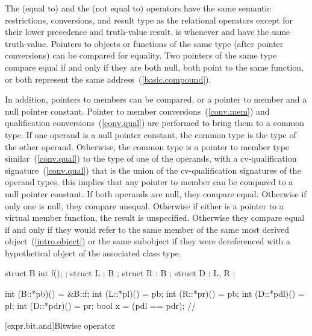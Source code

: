 \pnum
The \tcode{==} (equal to) and the \tcode{!=} (not equal to) operators
have the same semantic restrictions, conversions, and result type as the
relational operators except for their lower precedence and truth-value
result.
\enternote 
{} is  whenever  and 
have the same truth-value.
\exitnote 
{}%
%
Pointers to objects or functions of the same type (after pointer
conversions) can be compared for equality. Two pointers of the same type
compare equal if and only if they are both null, both point to the same
%
function, or both represent the same address~(\ref{basic.compound}).

\pnum
In addition, pointers to members can be compared, or a pointer to member
and a null pointer constant. Pointer to member
conversions~(\ref{conv.mem}) and qualification
conversions~(\ref{conv.qual}) are performed to bring them to a common
type. If one operand is a null pointer constant, the common type is the
type of the other operand. Otherwise, the common type is a pointer to
member type similar~(\ref{conv.qual}) to the type of one of the
operands, with a cv-qualification signature~(\ref{conv.qual}) that is
the union of the cv-qualification signatures of the operand types.
\enternote 
this implies that any pointer to member can be compared to a null
pointer constant.
\exitnote 
If both operands are null, they compare equal. Otherwise if only one is
null, they compare unequal. Otherwise if either is a pointer to a
virtual member function, the result is unspecified. Otherwise they
compare equal if and only if they would refer to the same member of the
same most derived object~(\ref{intro.object}) or the same subobject if
they were dereferenced with a hypothetical object of the associated
class type.
\enterexample 

\begin{codeblock}
struct B {
	int f();
};
struct L : B { };
struct R : B { };
struct D : L, R { };

int (B::*pb)() = &B::f;
int (L::*pl)() = pb;
int (R::*pr)() = pb;
int (D::*pdl)() = pl;
int (D::*pdr)() = pr;
bool x = (pdl == pdr);          // 
\end{codeblock}
\exitexampleb

[expr.bit.and]{Bitwise  operator}%
%
%
%
%


